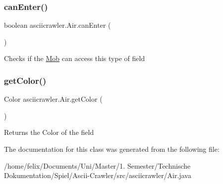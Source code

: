 \subsubsection{\texorpdfstring{can\+Enter()}{canEnter()}}
{\footnotesize\ttfamily boolean asciicrawler.\+Air.\+can\+Enter (\begin{DoxyParamCaption}{ }\end{DoxyParamCaption})\hspace{0.3cm}{\ttfamily [inline]}}

Checks if the \hyperlink{classasciicrawler_1_1Mob}{Mob} can access this type of field \mbox{\label{classasciicrawler_1_1Air_a4f2f155658f758d97a85944b117a87f3}} 
\subsubsection{\texorpdfstring{get\+Color()}{getColor()}}
{\footnotesize\ttfamily Color asciicrawler.\+Air.\+get\+Color (\begin{DoxyParamCaption}{ }\end{DoxyParamCaption})\hspace{0.3cm}{\ttfamily [inline]}}

Returns the Color of the field 

The documentation for this class was generated from the following file\+:\begin{DoxyCompactItemize}
\item 
/home/felix/\+Documents/\+Uni/\+Master/1. Semester/\+Technische Dokumentation/\+Spiel/\+Ascii-\/\+Crawler/src/asciicrawler/Air.\+java\end{DoxyCompactItemize}
